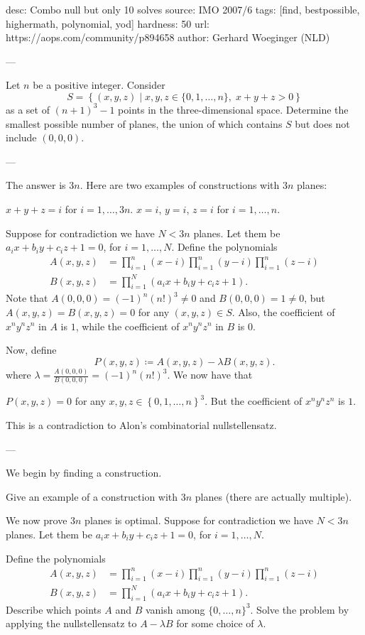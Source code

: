 desc:  Combo null but only 10 solves
source:  IMO 2007/6
tags:  [find, bestpossible, highermath, polynomial, yod]
hardness: 50
url: https://aops.com/community/p894658
author: Gerhard Woeginger (NLD)

---

Let $n$ be a positive integer.
Consider
\[ S = \left\{ (x,y,z) \mid
  x,y,z \in \{ 0, 1, \dots, n\}, \;
  x+y+z > 0 \right\} \]
as a set of $(n+1)^3-1$ points in the three-dimensional space.
Determine the smallest possible number of planes,
the union of which contains $S$ but does not include $(0,0,0)$.

---

The answer is $3n$.
Here are two examples of constructions with $3n$ planes:
\begin{itemize}
  \ii $x+y+z=i$ for $i=1,\dots,3n$.
  \ii $x=i$, $y=i$, $z=i$ for $i=1,\dots,n$.
\end{itemize}
Suppose for contradiction we have $N < 3n$ planes.
Let them be $a_i x + b_i y + c_i z + 1 = 0$, for $i = 1, \dots, N$.
Define the polynomials
\begin{align*}
  A(x,y,z) &= \prod_{i=1}^n (x-i) \prod_{i=1}^n (y-i) \prod_{i=1}^n (z-i) \\
  B(x,y,z) &= \prod_{i=1}^N \left( a_i x + b_i y + c_i z + 1 \right).
\end{align*}
Note that $A(0,0,0) = (-1)^n  (n!)^3 \neq 0$
and $B(0,0,0) =  1 \neq 0$,
but $A(x,y,z) = B(x,y,z) = 0$ for any $(x,y,z) \in S$.
Also, the coefficient of $x^n y^n z^n$ in $A$ is $1$,
while the coefficient of $x^n y^n z^n$ in $B$ is $0$.

Now, define
\[ P(x,y,z) \coloneqq A(x,y,z) - \lambda  B(x,y,z). \]
where $\lambda = \frac{A(0,0,0)}{B(0,0,0)} = (-1)^{n} (n!)^3$.
We now have that
\begin{itemize}
  \ii $P(x,y,z) = 0$ for any $x,y,z \in \left\{ 0,1,\dots,n \right\}^3$.
  \ii But the coefficient of $x^n y^n z^n$ is $1$.
\end{itemize}
This is a contradiction to Alon's combinatorial nullstellensatz.

---

We begin by finding a construction.
\begin{walk}
  \ii Give an example of a construction with $3n$ planes
  (there are actually multiple).
\end{walk}
We now prove $3n$ planes is optimal.
Suppose for contradiction we have $N < 3n$ planes.
Let them be $a_i x + b_i y + c_i z + 1 = 0$, for $i = 1, \dots, N$.
\begin{walk}[resume]
  \ii Define the polynomials
  \begin{align*}
    A(x,y,z) &= \prod_{i=1}^n (x-i) \prod_{i=1}^n (y-i) \prod_{i=1}^n (z-i) \\
    B(x,y,z) &= \prod_{i=1}^N \left( a_i x + b_i y + c_i z + 1 \right).
  \end{align*}
  Describe which points $A$ and $B$ vanish among $\{0, \dots, n\}^3$.
  \ii Solve the problem by applying the nullstellensatz
  to $A - \lambda B$ for some choice of $\lambda$.
\end{walk}
